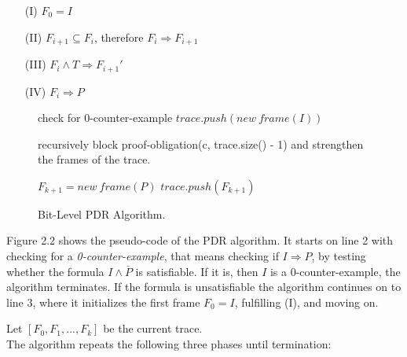 \documentclass[11pt, a4paper, BCOR=10mm, ngerman]{scrbook}
\begin{document}
\begin{itemize}
\item[(I)] $F_0 = I$
\item[(II)] $F_{i+1} \subseteq F_{i}$, therefore $F_i \Rightarrow F_{i+1}$
\item[(III)] $F_i \land T \Rightarrow F_{i+1}'$
\item[(IV)] $F_i \Rightarrow P$
\end{itemize}


\begin{figure}[H]
	\begin{algorithm}[H] 
		\begin{algorithmic}[1]
			\State check for 0-counter-example
			\State $trace.push(new\ frame(I))$
			\Statex
			\Loop
			
			\State recursively block proof-obligation(c, trace.size() - 1)
			\State and strengthen the frames of the trace.
			
			 
			\EndIf
			\EndWhile
			
			\Statex 
			
			\State $F_{k+1} = new\ frame(P)$
			\EndIf
			\EndFor
			\EndIf
			\State $trace.push(F_{k+1})$
			
			\EndLoop
			\EndProcedure
		\end{algorithmic}
	\end{algorithm}
	\caption{Bit-Level PDR Algorithm.}
\end{figure}

Figure 2.2 shows the pseudo-code of the PDR algorithm. It starts on line 2 with checking for a \textsl{0-counter-example}, that means checking if $I \Rightarrow P$, by testing whether the formula $I \land \bar P$ is satisfiable. If it is, then $I$ is a 0-counter-example, the algorithm terminates.
If the formula is unsatisfiable the algorithm continues on to line 3, where it initializes the first frame $F_0 = I$, fulfilling (I), and moving on. \par

Let $[F_0, F_1, ..., F_k]$ be the current trace. \\ 
The algorithm repeats the following three phases until termination: \par
\end{document}
